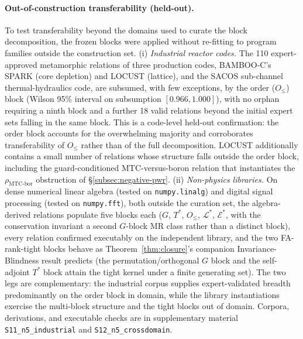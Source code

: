 \documentclass[manuscript]{acmart}
\begin{document}
\paragraph{Out-of-construction transferability (held-out).} To test transferability beyond the domains used to curate the block decomposition, the frozen blocks were applied without re-fitting to program families outside the construction set. (i) \emph{Industrial reactor codes.} The 110 expert-approved metamorphic relations of three production codes, BAMBOO-C's SPARK (core depletion) and LOCUST (lattice), and the SACOS sub-channel thermal-hydraulics code, are subsumed, with few exceptions, by the order ($O_{\le}$) block (Wilson 95\% interval on subsumption $[0.966, 1.000]$), with no orphan requiring a ninth block and a further 18 valid relations beyond the initial expert sets falling in the same block. This is a code-level held-out confirmation: the order block accounts for the overwhelming majority and corroborates transferability of $O_{\le}$ rather than of the full decomposition. LOCUST additionally contains a small number of relations whose structure falls outside the order block, including the guard-conditioned MTC-versus-boron relation that instantiates the $\rho_{\mathrm{MTC\text{-}bor}}$ obstruction of \S\ref{subsec:negative-pwr}. (ii) \emph{Non-physics libraries.} On dense numerical linear algebra (tested on \texttt{numpy.linalg}) and digital signal processing (tested on \texttt{numpy.fft}), both outside the curation set, the algebra-derived relations populate five blocks each ($G$, $T^{*}$, $O_{\le}$, $\mathcal{L}^{*}$, $\mathcal{E}^{*}$, with the conservation invariant a second $G$-block MR class rather than a distinct block), every relation confirmed executably on the independent library, and the two FA-rank-tight blocks behave as Theorem~\ref{thm:closure}'s companion Invariance-Blindness result predicts (the permutation/orthogonal $G$ block and the self-adjoint $T^{*}$ block attain the tight kernel under a finite generating set). The two legs are complementary: the industrial corpus supplies expert-validated breadth predominantly on the order block in domain, while the library instantiations exercise the multi-block structure and the tight blocks out of domain. Corpora, derivations, and executable checks are in supplementary material \texttt{S11\_n5\_industrial} and \texttt{S12\_n5\_crossdomain}.
\end{document}

